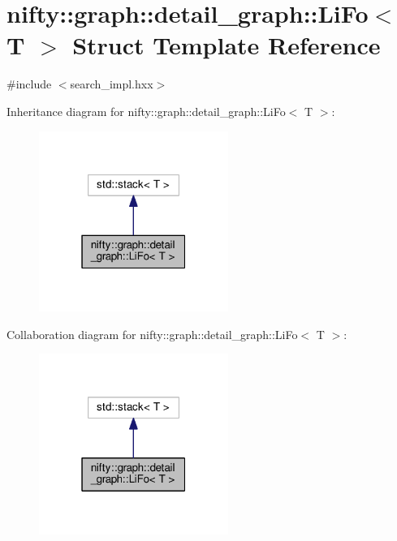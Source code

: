 \hypertarget{structnifty_1_1graph_1_1detail__graph_1_1LiFo}{}\section{nifty\+:\+:graph\+:\+:detail\+\_\+graph\+:\+:Li\+Fo$<$ T $>$ Struct Template Reference}
\label{structnifty_1_1graph_1_1detail__graph_1_1LiFo}


{\ttfamily \#include $<$search\+\_\+impl.\+hxx$>$}



Inheritance diagram for nifty\+:\+:graph\+:\+:detail\+\_\+graph\+:\+:Li\+Fo$<$ T $>$\+:\nopagebreak
\begin{figure}[H]
\begin{center}
\leavevmode
\includegraphics[width=175pt]{structnifty_1_1graph_1_1detail__graph_1_1LiFo__inherit__graph}
\end{center}
\end{figure}


Collaboration diagram for nifty\+:\+:graph\+:\+:detail\+\_\+graph\+:\+:Li\+Fo$<$ T $>$\+:\nopagebreak
\begin{figure}[H]
\begin{center}
\leavevmode
\includegraphics[width=175pt]{structnifty_1_1graph_1_1detail__graph_1_1LiFo__coll__graph}
\end{center}
\end{figure}
